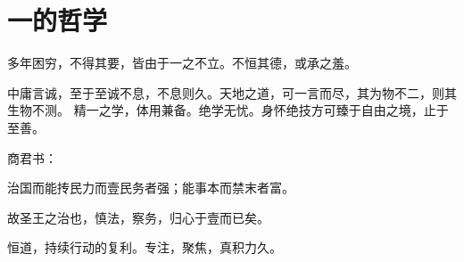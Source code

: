 \section{一的哲学}

多年困穷，不得其要，皆由于一之不立。不恒其德，或承之羞。

中庸言诚，至于至诚不息，不息则久。天地之道，可一言而尽，其为物不二，则其生物不测。
精一之学，体用兼备。绝学无忧。身怀绝技方可臻于自由之境，止于至善。

商君书：
\begin{shadequote}

治国而能抟民力而壹民务者强；能事本而禁末者富。

故圣王之治也，慎法，察务，归心于壹而已矣。
\end{shadequote}

恒道，持续行动的复利。专注，聚焦，真积力久。
